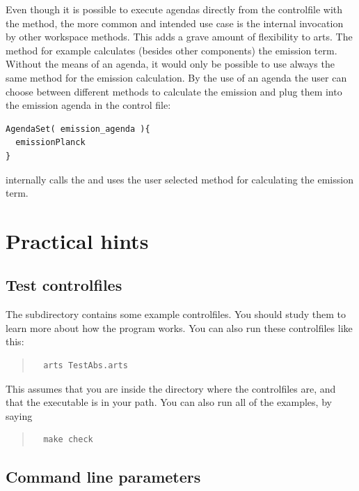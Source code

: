 Even though it is possible to execute agendas directly from the
controlfile with the  method, the more common
and intended use case is the internal invocation by other workspace
methods. This adds a grave amount of flexibility to arts. The
 method for example calculates (besides other
components) the emission term. Without the means of an agenda, it
would only be possible to use always the same method for the emission
calculation. By the use of an agenda the user can choose between
different methods to calculate the emission and plug them into the
emission agenda in the control file:

{\small
\begin{verbatim}
AgendaSet( emission_agenda ){
  emissionPlanck
}
\end{verbatim}
}

\noindent
{} internally calls the  and
uses the user selected method for calculating the emission term.



\section{Practical hints}
\label{sec:concept:practical}

\subsection{Test controlfiles}

The subdirectory  contains some example controlfiles.
You should study them to learn more about how the program works. You
can also run these controlfiles like this:
\begin{quote}
\begin{verbatim}
  arts TestAbs.arts
\end{verbatim}
\end{quote}
This assumes that you are inside the directory where the controlfiles
are, and that the  executable is in your path.  You can
also run all of the examples, by saying
\begin{quote}
\begin{verbatim}
  make check
\end{verbatim}
\end{quote}

\subsection{Command line parameters}

